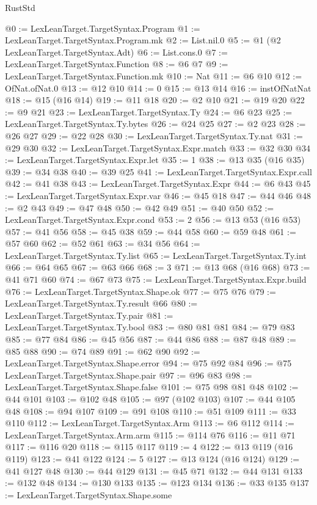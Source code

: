 \begin{lexlean}{RustStd}
\begin{coremodule}
@0 := LexLeanTarget.TargetSyntax.Program
@1 := LexLeanTarget.TargetSyntax.Program.mk
@2 := List.nil.{0}
@5 := @1 (@2 LexLeanTarget.TargetSyntax.Adt)
@6 := List.cons.{0}
@7 := LexLeanTarget.TargetSyntax.Function
@8 := @6 @7
@9 := LexLeanTarget.TargetSyntax.Function.mk
@10 := Nat
@11 := @6 @10
@12 := OfNat.ofNat.{0}
@13 := @12 @10
@14 := 0
@15 := @13 @14
@16 := instOfNatNat
@18 := @15 (@16 @14)
@19 := @11 @18
@20 := @2 @10
@21 := @19 @20
@22 := @9 @21
@23 := LexLeanTarget.TargetSyntax.Ty
@24 := @6 @23
@25 := LexLeanTarget.TargetSyntax.Ty.bytes
@26 := @24 @25
@27 := @2 @23
@28 := @26 @27
@29 := @22 @28
@30 := LexLeanTarget.TargetSyntax.Ty.nat
@31 := @29 @30
@32 := LexLeanTarget.TargetSyntax.Expr.match
@33 := @32 @30
@34 := LexLeanTarget.TargetSyntax.Expr.let
@35 := 1
@38 := @13 @35 (@16 @35)
@39 := @34 @38
@40 := @39 @25
@41 := LexLeanTarget.TargetSyntax.Expr.call
@42 := @41 @38
@43 := LexLeanTarget.TargetSyntax.Expr
@44 := @6 @43
@45 := LexLeanTarget.TargetSyntax.Expr.var
@46 := @45 @18
@47 := @44 @46
@48 := @2 @43
@49 := @47 @48
@50 := @42 @49
@51 := @40 @50
@52 := LexLeanTarget.TargetSyntax.Expr.cond
@53 := 2
@56 := @13 @53 (@16 @53)
@57 := @41 @56
@58 := @45 @38
@59 := @44 @58
@60 := @59 @48
@61 := @57 @60
@62 := @52 @61
@63 := @34 @56
@64 := LexLeanTarget.TargetSyntax.Ty.list
@65 := LexLeanTarget.TargetSyntax.Ty.int
@66 := @64 @65
@67 := @63 @66
@68 := 3
@71 := @13 @68 (@16 @68)
@73 := @41 @71 @60
@74 := @67 @73
@75 := LexLeanTarget.TargetSyntax.Expr.build
@76 := LexLeanTarget.TargetSyntax.Shape.ok
@77 := @75 @76
@79 := LexLeanTarget.TargetSyntax.Ty.result @66
@80 := LexLeanTarget.TargetSyntax.Ty.pair
@81 := LexLeanTarget.TargetSyntax.Ty.bool
@83 := @80 @81 @81
@84 := @79 @83
@85 := @77 @84
@86 := @45 @56
@87 := @44 @86
@88 := @87 @48
@89 := @85 @88
@90 := @74 @89
@91 := @62 @90
@92 := LexLeanTarget.TargetSyntax.Shape.error
@94 := @75 @92 @84
@96 := @75 LexLeanTarget.TargetSyntax.Shape.pair
@97 := @96 @83
@98 := LexLeanTarget.TargetSyntax.Shape.false
@101 := @75 @98 @81 @48
@102 := @44 @101
@103 := @102 @48
@105 := @97 (@102 @103)
@107 := @44 @105 @48
@108 := @94 @107
@109 := @91 @108
@110 := @51 @109
@111 := @33 @110
@112 := LexLeanTarget.TargetSyntax.Arm
@113 := @6 @112
@114 := LexLeanTarget.TargetSyntax.Arm.arm
@115 := @114 @76
@116 := @11 @71
@117 := @116 @20
@118 := @115 @117
@119 := 4
@122 := @13 @119 (@16 @119)
@123 := @41 @122
@124 := 5
@127 := @13 @124 (@16 @124)
@129 := @41 @127 @48
@130 := @44 @129
@131 := @45 @71
@132 := @44 @131
@133 := @132 @48
@134 := @130 @133
@135 := @123 @134
@136 := @33 @135
@137 := LexLeanTarget.TargetSyntax.Shape.some

\end{coremodule}
\end{lexlean}
